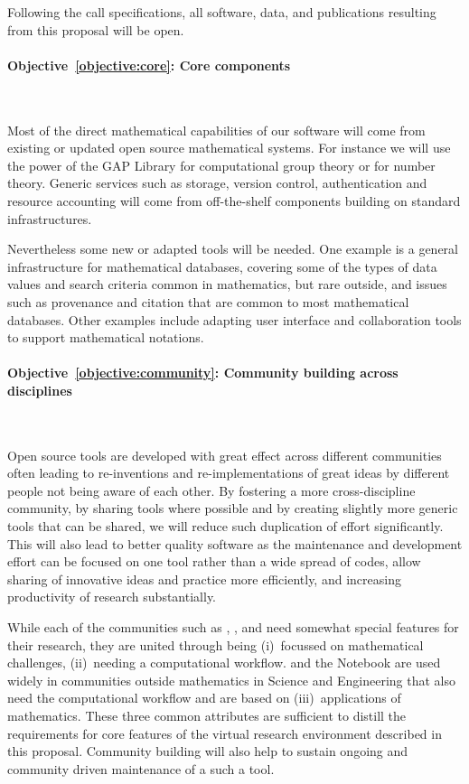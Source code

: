 \documentclass[noworkareas,deliverables,keys]{euproposal}                  %
\begin{document}
\begin{proposal}
Following the call specifications, all software, data, and
publications resulting from this proposal will be open.



\paragraph{Objective~\ref{objective:core}: Core components}\

Most of the direct mathematical capabilities of our software will come
from existing or updated open source mathematical systems. For instance we will
use the power of the GAP Library for computational group theory or
\PariGP for number theory. Generic services such as storage, version
control, authentication and resource accounting will come from
off-the-shelf components building on standard infrastructures. 

Nevertheless some new or adapted tools will be needed. One example is
a general infrastructure for mathematical databases, covering some of
the types of data values and search criteria common in mathematics,
but rare outside, and issues such as provenance and citation that are
common to most mathematical databases. Other examples include adapting
user interface and collaboration tools to support mathematical notations.




\paragraph{Objective~\ref{objective:community}: Community building across disciplines}\ 


Open source tools are developed with great effect across different
communities often leading to re-inventions and re-implementations of
great ideas by different people not being aware of each other. By
fostering a more cross-discipline community, by sharing tools where
possible and by creating slightly more generic tools that can be shared,
we will reduce such duplication of effort significantly. This will
also lead to better quality software as the maintenance and
development effort can be focused on one tool rather than a wide
spread of codes, allow sharing of innovative ideas and practice more
efficiently, and increasing productivity of research substantially.

While each of the communities such as \Sage, \Singular, and \GAP need
somewhat special features for their research, they are united through
being (i)~focussed on mathematical challenges, (ii)~needing a
computational workflow. \IPython and the \Jupyter Notebook are used
widely in communities outside mathematics in Science and Engineering
that also need the computational workflow and are based on
(iii)~applications of mathematics. These three common attributes are
sufficient to distill the requirements for core features of the
virtual research environment described in this \TheProject{}
proposal. Community building will also help to sustain ongoing and
community driven maintenance of a such a tool.




\end{proposal}
\end{document}
